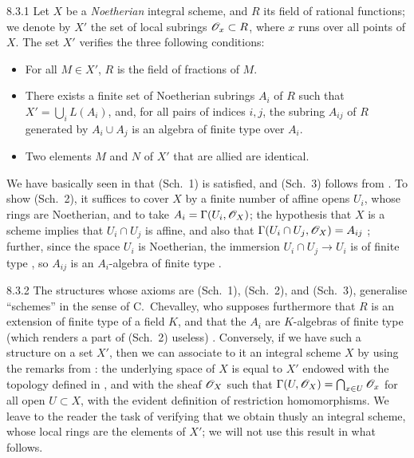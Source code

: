 \documentclass[10pt,oneside]{book}
\begin{document}
\begin{env}{8.3.1}
\label{env-1.8.3.1}
Let $X$ be a \emph{Noetherian} integral scheme, and $R$ its
field of rational functions; we denote by $X'$ the set of local subrings
$\mathscr{O}_x\subset R$, where $x$ runs over all points of $X$. The set $X'$ verifies
the three following conditions:
\begin{itemize}
  \item[(Sch.~1)] For all $M\in X'$, $R$ is the field of fractions of $M$.
  \item[(Sch.~2)] There exists a finite set of Noetherian subrings $A_i$ of $R$
  such that $X'=\bigcup_i L(A_i)$, and, for all pairs of indices $i,j$, the subring
  $A_{ij}$ of $R$ generated by $A_i\cup A_j$ is an algebra of finite type over $A_i$.
  \item[(Sch.~3)] Two elements $M$ and $N$ of $X'$ that are allied are identical.
\end{itemize}
\end{env}

We have basically seen in  that (Sch.~1) is satisfied, and (Sch.~3)
follows from . To show (Sch.~2), it suffices to cover $X$ by a
finite number of affine opens $U_i$, whose rings are Noetherian, and to take
$A_i=\Gamma(U_i,\mathscr{O}_X)$; the hypothesis that $X$ is a scheme implies that
$U_i\cap U_j$ is affine, and also that $\Gamma(U_i\cap U_j,\mathscr{O}_X)=A_{ij}$
; further, since the space $U_i$ is Noetherian, the immersion
$U_i\cap U_j\to U_i$ is of finite type , so $A_{ij}$ is an
$A_i$-algebra of finite type .

\begin{env}{8.3.2}
\label{env-1.8.3.2}
The structures whose axioms are (Sch.~1), (Sch.~2), and
(Sch.~3), generalise ``schemes'' in the sense of C.~Chevalley, who supposes
furthermore that $R$ is an extension of finite type of a field $K$, and that the
$A_i$ are $K$-algebras of finite type (which renders a part of (Sch.~2) useless)
\cite{1}. Conversely, if we have such a structure on a set $X'$, then we can
associate to it an integral scheme $X$ by using the remarks from :
the underlying space of $X$ is equal to $X'$ endowed with the topology defined
in , and with the sheaf $\mathscr{O}_X$ such that
$\Gamma(U,\mathscr{O}_X)=\bigcap_{x\in U}\mathscr{O}_x$ for all open $U\subset X$, with the
evident definition of restriction homomorphisms. We leave to the reader the
task of verifying that we obtain thusly an integral scheme, whose local rings
are the elements of $X'$; we will not use this result in what follows.
\end{env}
\end{document}
